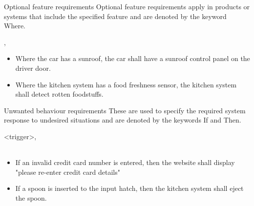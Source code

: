 \documentclass[aspectratio=169]{beamer}
\begin{document}
\begin{slide}{Optional feature requirements}
  Optional feature requirements apply in products or systems that include the specified feature and are denoted by the keyword Where.
    \begin{block}{}\centering
      ,
    \end{block}
  
  \begin{example}
  \begin{itemize}
    \item Where the car has a sunroof, the car shall have a sunroof control panel on the driver door.
    \item Where the kitchen system has a food freshness sensor, the kitchen system shall detect rotten foodstuffs. 
  \end{itemize}
  \end{example}
\end{slide}



\begin{slide}{Unwanted behaviour requirements}
    These are used to specify the required system response to undesired situations and are denoted by the keywords If and Then.
    \begin{block}{}
     \eif <trigger>, \ethen\\
      \\
    \end{block}
      
  \begin{example}
  \begin{itemize}
    \item If an invalid credit card number is entered, then the website shall display "please re-enter credit card details"
    \item  If a spoon is inserted to the input hatch, then the kitchen system shall eject the spoon.
  \end{itemize}
  \end{example}
\end{slide}
\end{document}
